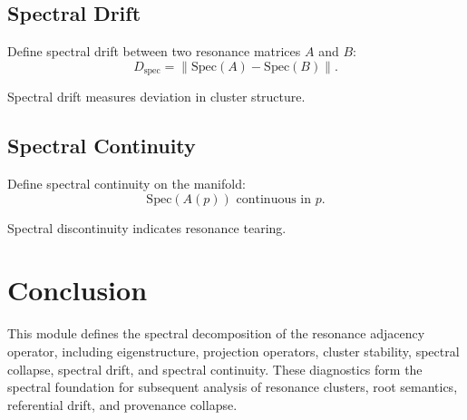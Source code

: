 \subsection{Spectral Drift}

Define spectral drift between two resonance matrices $A$ and $B$:
\[
D_{\mathrm{spec}} = \left\| \mathrm{Spec}(A) - \mathrm{Spec}(B) \right\|.
\]

Spectral drift measures deviation in cluster structure.

\subsection{Spectral Continuity}

Define spectral continuity on the manifold:
\[
\mathrm{Spec}(A(p)) \text{ continuous in } p.
\]

Spectral discontinuity indicates resonance tearing.

\section{Conclusion}

This module defines the spectral decomposition of the resonance adjacency
operator, including eigenstructure, projection operators, cluster stability,
spectral collapse, spectral drift, and spectral continuity. These diagnostics
form the spectral foundation for subsequent analysis of resonance clusters,
root semantics, referential drift, and provenance collapse.
